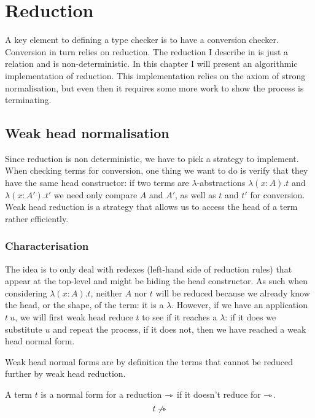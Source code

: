 \chapter{Reduction}

A key element to defining a type checker is to have a conversion checker.
Conversion in turn relies on reduction. The reduction I describe in
 is just a relation and is non-deterministic. In this chapter
I will present an algorithmic implementation of reduction.
This implementation relies on the axiom of strong normalisation, but even then
it requires some more work to show the process is terminating.

\section{Weak head normalisation}

Since reduction is non deterministic, we have to pick a strategy to implement.
When checking terms for conversion, one thing we want to do is verify that they
have the same head constructor: if two terms are \(\lambda\)-abstractions
\(\lambda (x:A).t\) and \(\lambda (x:A').t'\) we need only compare \(A\) and
\(A'\), as well as \(t\) and \(t'\) for conversion.
Weak head reduction is a strategy that allows us to access the head of a term
rather efficiently.

\subsection{Characterisation}

The idea is to only deal with redexes (\ie left-hand side of reduction rules)
that appear at the top-level and might be hiding the head constructor. As such
when considering \(\lambda (x:A).t\), neither \(A\) nor \(t\) will be reduced
because we already know the head, or the shape, of the term: it is a
\(\lambda\). However, if we have an application \(t\ u\), we will first weak
head reduce \(t\) to see if it reaches a \(\lambda\): if it does we substitute
\(u\) and repeat the process, if it does not, then we have reached a weak head
normal form.

Weak head normal forms are by definition the terms that cannot be reduced
further by weak head reduction.

\begin{definition}
  A term \(t\) is a normal form for a reduction \(\rightarrowtriangle\) if it doesn't reduce
  for \(\rightarrowtriangle\).
  \[
    t \not \rightarrowtriangle
  \]
\end{definition}

